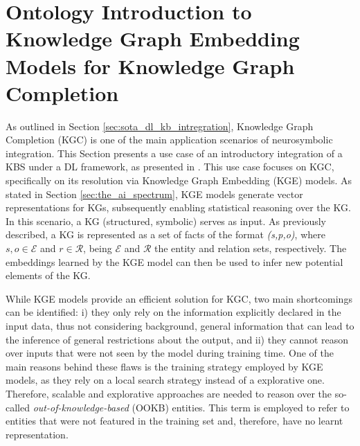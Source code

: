 \section{Ontology Introduction to Knowledge Graph Embedding Models for Knowledge Graph Completion} \label{subsec:ontointro_kgc}

As outlined in Section \ref{sec:sota_dl_kb_intregration}, Knowledge Graph Completion (KGC) is one of the main application scenarios of neurosymbolic integration. This Section presents a use case of an introductory integration of a KBS under a DL framework, as presented in \cite{amadoretalontodl}. This use case focuses on KGC, specifically on its resolution via Knowledge Graph Embedding (KGE) models. As stated in Section \ref{sec:the_ai_spectrum}, KGE models generate vector representations for KGs, subsequently enabling statistical reasoning over the KG. In this scenario, a KG (structured, symbolic) serves as input. As previously described, a KG is represented as a set of facts of the format \textit{(s,p,o)}, where $s,o \in \mathcal{E}$ and $r \in \mathcal{R}$, being $\mathcal{E}$ and $\mathcal{R}$ the entity and relation sets, respectively. The embeddings learned by the KGE model can then be used to infer new potential elements of the KG. 

While KGE models provide an efficient solution for KGC, two main shortcomings can be identified: i) they only rely on the information explicitly declared in the input data, thus not considering background, general information that can lead to the inference of general restrictions about the output, and ii) they cannot reason over inputs that were not seen by the model during training time. One of the main reasons behind these flaws is the training strategy employed by KGE models, as they rely on a local search strategy instead of a explorative one. Therefore, scalable and explorative approaches are needed to reason over the so-called \textit{out-of-knowledge-based} (OOKB) entities. This term is employed to refer to entities that were not featured in the training set and, therefore, have no learnt representation. 

